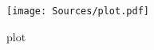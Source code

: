 \documentclass[]{article}
\begin{document}
\begin{figure}
\texttt{[image: Sources/plot.pdf]}
\caption{plot}
\end{figure}
\end{document}
